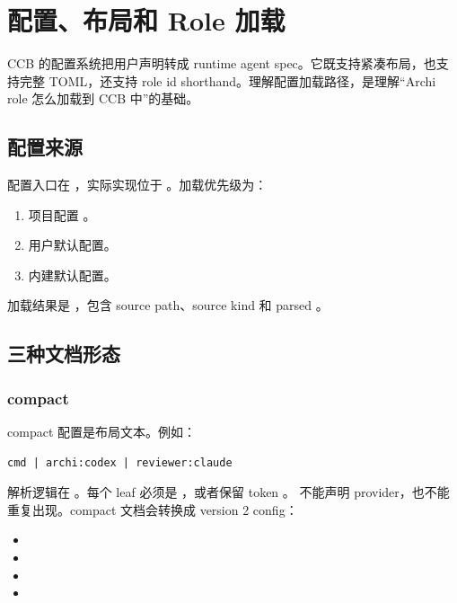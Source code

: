 \chapter{配置、布局和 Role 加载}

CCB 的配置系统把用户声明转成 runtime agent spec。它既支持紧凑布局，也支持完整 TOML，还支持 role id shorthand。理解配置加载路径，是理解“Archi role 怎么加载到 CCB 中”的基础。

\section{配置来源}

配置入口在 ，实际实现位于 。加载优先级为：

\begin{enumerate}
  \item 项目配置 。
  \item 用户默认配置。
  \item 内建默认配置。
\end{enumerate}

加载结果是 ，包含 source path、source kind 和 parsed 。

\section{三种文档形态}

\subsection{compact}

compact 配置是布局文本。例如：

\begin{lstlisting}
cmd | archi:codex | reviewer:claude
\end{lstlisting}

解析逻辑在 。每个 leaf 必须是 ，或者保留 token 。 不能声明 provider，也不能重复出现。compact 文档会转换成 version 2 config：

\begin{itemize}
  \item {}
  \item {}
  \item {}
  \item {}
\end{itemize}


